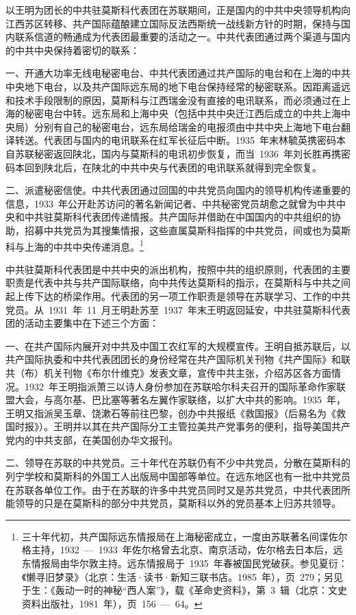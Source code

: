 以王明为团长的中共驻莫斯科代表团在苏联期间，正是国内的中共中央领导机构向江西苏区转移、共产国际蕴酿建立国际反法西斯统一战线新方针的时期，保持与国内联系信道的畅通成为代表团最重要的活动之一。中共代表团通过两个渠道与国内的中共中央保持着密切的联系：

一、开通大功率无线电秘密电台、中共代表团通过共产国际的电台和在上海的中共中央地下电台，以及共产国际远东局的地下电台保持经常的秘密联系。因距离遥远和技术手段限制的原因，莫斯科与江西瑞金没有直接的电讯联系，而必须通过在上海的秘密电台中转。远东局和上海中央（包括中共中央迁江西后成立的中共上海中央局）分别有自己的秘密电台，远东局给瑞金的电报须由中共中央上海地下电台翻译转送。代表团与国内的电讯联系在红军长征后中断。1935~年末林毓英携密码本自苏联秘密返回陕北，国内与莫斯科的电讯初步恢复，而当~1936~年刘长胜再携密码本回到陕北后，在陕北的中共中央与代表团的电讯联系就得到完全恢复。

二、派遣秘密信使。中共代表团通过回国的中共党员向国内的领导机构传递重要的信息，1933~年公开赴苏访问的著名新闻记者、中共秘密党员胡愈之就曾为中共中央和中共驻莫斯科代表团传递情报。共产国际并借助在中国国内的中共组织的协助，招募中共党员为其搜集情报，这些直属莫斯科指挥的中共党员，间或也为莫斯科与上海的中共中央传递消息。\footnote{三十年代初，共产国际远东情报局在上海秘密成立，一度由苏联著名间谍佐尔格主持，1932~—~1933~年佐尔格曾去北京、南京活动，佐尔格去日本后，远东情报局由华尔敦主持。远东情报局于~1935~年春被国民党破获。参见夏衍：《懒寻旧梦录》（北京：生活·读书·新知三联书店。1985~年），页~279；另见于生：《轰动一时的神秘“西人案”》，载《革命史资料》，第~3~辑（北京：文史资料出版社，1981~年），页~156~—~64。}

中共驻莫斯科代表团是中共中央的派出机构，按照中共的组织原则，代表团的主要职责是代表中共与共产国际联络，向中共传达莫斯科的指示，在莫斯科与中共之间起上传下达的桥梁作用。代表团的另一项工作职责是领导在苏联学习、工作的中共党员。从~1931~年~11~月王明赴苏至~1937~年末王明返回延安，中共驻莫斯科代表团的活动主要集中在下述三个方面：

一、在共产国际内展开对中共及中国工农红军的大规模宣传。王明自抵苏联后，以共产国际执委和中共代表团团长的身份经常在共产国际机关刊物《共产国际》和联共（布）机关刊物《布尔什维克》发表文章，宣传中共主张，介绍苏区各方面情况。1932~年王明指派萧三以诗人身份参加在苏联哈尔科夫召开的国际革命作家联盟大会，与高尔基、巴比塞等著名左翼作家联络，以扩大中共的影响。1935~年，王明又指派吴玉章、饶漱石等前往巴黎，创办中共报纸《救国报》（后易名为《救国时报》）。王明并以其在共产国际分工主管拉美共产党事务的便利，指导美国共产党内的中共支部，在美国创办华文报刊。

二、领导在苏联的中共党员。三十年代在苏联仍有不少中共党员，分散在莫斯科的列宁学校和莫斯科的外国工人出版局中国部等单位。在远东地区也有一批中共党员在苏联各单位工作。由于在苏联的许多中共党员同时又是苏共党员，中共代表团所能领导的只是在莫斯科的部分中共党员，莫斯科以外的党员基本上归苏共领导。

